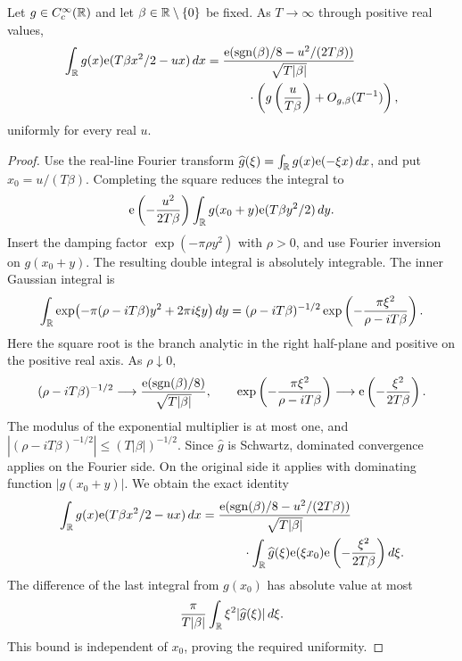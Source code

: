 \begin{lemma}
\label{lem:quadratic}
Let $g\in C_c^\infty(\mathbb R)$ and let $\beta\in\mathbb R\setminus\{0\}$ be fixed.
As $T\to\infty$ through positive real values,
\begin{equation}
 \label{eq:uniform-quadratic}
 \begin{split}
 \int_{\mathbb R}g(x)\mathrm e(T\beta x^2/2-ux)\,dx
 ={}&\frac{\mathrm e(\operatorname{sgn}(\beta)/8-u^2/(2T\beta))}
 {\sqrt{T|\beta|}}\\
 &\qquad\cdot\left(g\left(\frac{u}{T\beta}\right)
       +O_{g,\beta}(T^{-1})\right),
 \end{split}
\end{equation}
uniformly for every real $u$.
\end{lemma}

\begin{proof}
Use the real-line Fourier transform
$\widehat g(\xi)=\int_{\mathbb R}g(x)\mathrm e(-\xi x)\,dx$, and put
$x_0=u/(T\beta)$.  Completing the square reduces the integral to
\[
 \mathrm e\left(-\frac{u^2}{2T\beta}\right)
 \int_{\mathbb R}g(x_0+y)\mathrm e(T\beta y^2/2)\,dy.
\]
Insert the damping factor $\exp(-\pi\rho y^2)$ with $\rho>0$, and use
Fourier inversion on $g(x_0+y)$.  The resulting double integral is
absolutely integrable.  The inner Gaussian integral is
\[
 \int_{\mathbb R}\exp\bigl(-\pi(\rho-iT\beta)y^2+2\pi i\xi y\bigr)\,dy
 =(\rho-iT\beta)^{-1/2}
   \exp\left(-\frac{\pi\xi^2}{\rho-iT\beta}\right).
\]
Here the square root is the branch analytic in the right half-plane
and positive on the positive real axis.  As $\rho\downarrow0$,
\[
 (\rho-iT\beta)^{-1/2}
 \longrightarrow\frac{\mathrm e(\operatorname{sgn}(\beta)/8)}{\sqrt{T|\beta|}},
 \qquad
 \exp\left(-\frac{\pi\xi^2}{\rho-iT\beta}\right)
 \longrightarrow\mathrm e\left(-\frac{\xi^2}{2T\beta}\right).
\]
The modulus of the exponential multiplier is at most one, and
$|(\rho-iT\beta)^{-1/2}|\le(T|\beta|)^{-1/2}$.  Since $\widehat g$ is
Schwartz, dominated convergence applies on the Fourier side.  On the
original side it applies with dominating function $|g(x_0+y)|$.
We obtain the exact identity
\begin{equation}
 \label{eq:quadratic-exact}
 \begin{split}
 \int_{\mathbb R}g(x)\mathrm e(T\beta x^2/2-ux)\,dx
 ={}&\frac{\mathrm e(\operatorname{sgn}(\beta)/8-u^2/(2T\beta))}
 {\sqrt{T|\beta|}}\\
 &\qquad\cdot\int_{\mathbb R}\widehat g(\xi)\mathrm e(\xi x_0)
                   \mathrm e\left(-\frac{\xi^2}{2T\beta}\right)d\xi.
 \end{split}
\end{equation}
The difference of the last integral from $g(x_0)$ has absolute value at
most
\[
 \frac{\pi}{T|\beta|}\int_{\mathbb R}\xi^2|\widehat g(\xi)|\,d\xi.
\]
This bound is independent of $x_0$, proving the required uniformity.
\end{proof}

